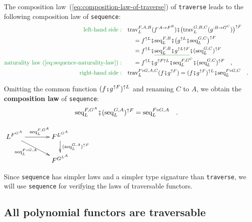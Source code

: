 The composition law~(\ref{eq:composition-law-of-traverse}) of \lstinline!traverse!
leads to the following composition law of \lstinline!sequence!:
\begin{align*}
{\color{greenunder}\text{left-hand side}:}\quad & \text{trav}_{L}^{F,A,B}(f^{:A\rightarrow F^{B}})\bef\big(\text{trav}_{L}^{G,B,C}(g^{:B\rightarrow G^{C}})\big)^{\uparrow F}\\
 & \quad=f^{\uparrow L}\bef\text{seq}_{L}^{F,B}\bef\big(g^{\uparrow L}\bef\text{seq}_{L}^{G,C}\big)^{\uparrow F}\\
 & \quad=f^{\uparrow L}\bef\gunderline{\text{seq}_{L}^{F,B}\bef g^{\uparrow L\uparrow F}}\bef(\text{seq}_{L}^{G,C})^{\uparrow F}\\
{\color{greenunder}\text{naturality law~(\ref{eq:sequence-naturality-law})}:}\quad & \quad=f^{\uparrow L}\bef g^{\uparrow F\uparrow L}\bef\text{seq}_{L}^{F,G^{C}}\bef(\text{seq}_{L}^{G,C})^{\uparrow F}\quad,\\
{\color{greenunder}\text{right-hand side}:}\quad & \text{trav}_{L}^{F\circ G,A,C}(f\bef g^{\uparrow F})=(f\bef g^{\uparrow F})^{\uparrow L}\bef\text{seq}_{L}^{F\circ G,C}\quad.
\end{align*}

Omitting the common function $(f\bef g^{\uparrow F})^{\uparrow L}$
and renaming $C$ to $A$, we obtain the \textbf{composition
law} of \lstinline!sequence!:
\begin{equation}
\text{seq}_{L}^{F,G^{A}}\bef(\text{seq}_{L}^{G,A})^{\uparrow F}=\text{seq}_{L}^{F\circ G,A}\quad.\label{eq:composition-law-of-sequence}
\end{equation}

\begin{center}
$\xymatrix{\xyScaleY{1.4pc}\xyScaleX{3.0pc}L^{F^{G^{A}}}\ar[r]\sp(0.55){\text{seq}_{L}^{F,G^{A}}}\ar[rd]\sb(0.4){\text{seq}_{L}^{F\circ G,A}} & F^{L^{G^{A}}}\ar[d]\sp(0.4){(\text{seq}_{L}^{G,A})^{\uparrow F}}\\
 & F^{G^{L^{A}}}
}
$
\par\end{center}

Since \lstinline!sequence! has simpler laws and a simpler type signature
than \lstinline!traverse!, we will use \lstinline!sequence! for
verifying the laws of traversable functors. 

\subsection{All polynomial functors are traversable\label{subsec:All-polynomial-functors-are-traversable}}

